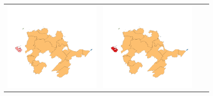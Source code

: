 \begin{figure}
\begin{tabularx}{1\textwidth}{XXXX}
\includegraphics[width=1\linewidth]{images/ch6/contig/13}&
\includegraphics[width=1\linewidth]{images/ch6/contig/14}&

\end{tabularx}
\end{figure}
